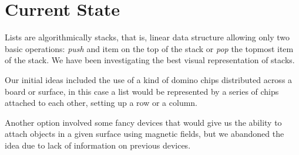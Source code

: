 \section{Current State}

Lists are algorithmically stacks, that is, linear data structure
allowing only two basic operations: \emph{push} and item on the top of
the stack or \emph{pop} the topmost item of the stack. We have been
investigating the best visual representation of stacks.

Our initial ideas included the use of a kind of domino chips
distributed across a board or surface, in this case a list would be
represented by a series of chips attached to each other, setting up a
row or a column.

Another option involved some fancy devices that would give us the
ability to attach objects in a given surface using magnetic fields,
but we abandoned the idea due to lack of information on previous
devices.

